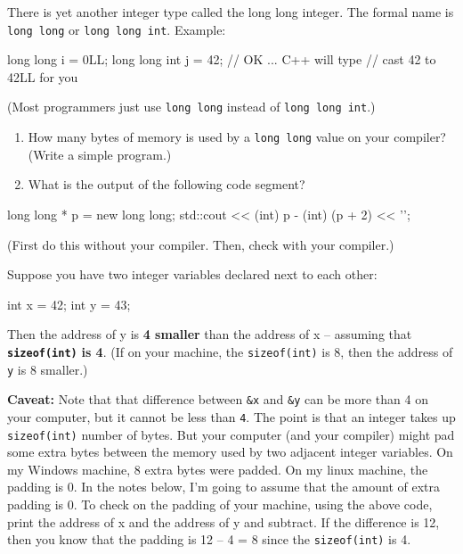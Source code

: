 \begin{ex}
There is yet another integer type called the long long
integer. The formal name is \texttt{long long} or \texttt{long long
int}. Example:

\begin{consolethree}[escapeinside=||]
long long i = 0LL;
long long int j = 42; // OK ... C++ will type
                      // cast 42 to 42LL for you
\end{consolethree}

(Most programmers just use \texttt{long long} instead of \texttt{long long
int}.)

\begin{enumerate}
\def\labelenumi{(\alph{enumi})}
\item How many bytes of memory is used by a \texttt{long long} value on
  your compiler? (Write a simple program.)
\item What is the output of the following code segment?
\end{enumerate}

\begin{consolethree}[escapeinside=||]
long long * p = new long long;
std::cout << (int) p - (int) (p + 2) << '\n';
\end{consolethree}

(First do this without your compiler. Then, check with your compiler.)
\end{ex}


\newpage{}

Suppose you have two integer variables declared next to each other:

\begin{consolethree}[escapeinside=||]
int x = 42;
int y = 43;
\end{consolethree}

Then the address of y is \textbf{4 smaller} than the address of x --
assuming that \texttt{\textbf{sizeof(int)}}\textbf{ is 4}. (If on your
machine, the \texttt{sizeof(int)} is 8, then the address of \texttt{y} is 8
smaller.)

\textbf{Caveat:} Note that that difference between \texttt{\&x} and
\texttt{\&y} can be more than 4 on your computer, but it cannot be less
than \texttt{4}. The point is that an integer takes up \texttt{sizeof(int)}
number of bytes. But your computer (and your compiler) might pad some
extra bytes between the memory used by two adjacent integer variables.
On my Windows machine, 8 extra bytes were padded. On my linux machine,
the padding is 0. In the notes below, I'm going to assume that the
amount of extra padding is 0. To check on the padding of your machine,
using the above code, print the address of x and the address of y and
subtract. If the difference is 12, then you know that the padding is 12
-- 4 = 8 since the \texttt{sizeof(int)} is 4.

